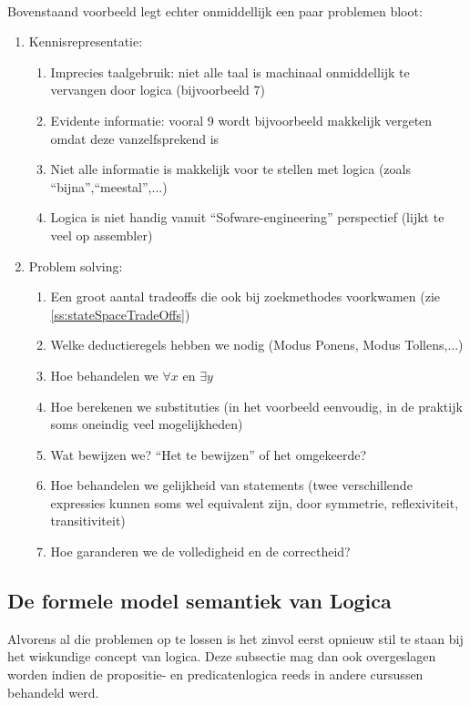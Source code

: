 \paragraph{}
Bovenstaand voorbeeld legt echter onmiddellijk een paar problemen bloot:
\begin{enumerate}
 \item Kennisrepresentatie:
\begin{enumerate}
 \item Imprecies taalgebruik: niet alle taal is machinaal onmiddellijk te vervangen door logica (bijvoorbeeld 7)
 \item Evidente informatie: vooral 9 wordt bijvoorbeeld makkelijk vergeten omdat deze vanzelfsprekend is
 \item Niet alle informatie is makkelijk voor te stellen met logica (zoals ``bijna'',``meestal'',...)
 \item Logica is niet handig vanuit ``Sofware-engineering'' perspectief (lijkt te veel op assembler)
\end{enumerate}
 \item Problem solving:
\begin{enumerate}
 \item Een groot aantal tradeoffs die ook bij zoekmethodes voorkwamen (zie \ref{ss:stateSpaceTradeOffs})
 \item Welke deductieregels hebben we nodig (Modus Ponens, Modus Tollens,...)
 \item Hoe behandelen we $\forall x$ en $\exists y$
 \item Hoe berekenen we substituties (in het voorbeeld eenvoudig, in de praktijk soms oneindig veel mogelijkheden)
 \item Wat bewijzen we? ``Het te bewijzen'' of het omgekeerde?
 \item Hoe behandelen we gelijkheid van statements (twee verschillende expressies kunnen soms wel equivalent zijn, door symmetrie, reflexiviteit, transitiviteit)
 \item Hoe garanderen we de volledigheid en de correctheid?
\end{enumerate}
\end{enumerate}
\subsection{De formele model semantiek van Logica}
Alvorens al die problemen op te lossen is het zinvol eerst opnieuw stil te staan bij het wiskundige concept van logica. Deze subsectie mag dan ook overgeslagen worden indien de propositie- en predicatenlogica reeds in andere cursussen behandeld werd.
